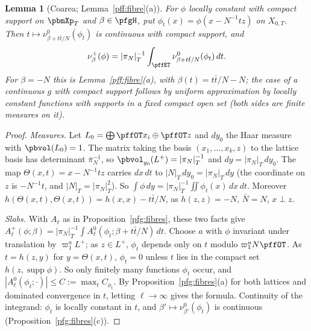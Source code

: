 \documentclass[10pt]{amsart}
\newtheorem{lemma}[theorem]{Lemma}
\theoremstyle{definition}
\theoremstyle{remark}
\begin{document}
\begin{lemma}[Coarea; Lemma~\ref{pff:fibre}(a)]\label{pfg:coarea}
For $\phi$ locally constant with compact support on $\pbmXp_T$ and $\beta\in\pfgH$, put $\phi_t(x)=\phi(x-N^{-1}tz)$ on
$X_{0,T}$. Then $t\mapsto\nu^0_{\beta+t\bar t/N}(\phi_t)$ is continuous with compact support, and
\[
\nu^+_\beta(\phi)=|\pi_N|_T^{-1}\int_{\pffET}\nu^0_{\beta+t\bar t/N}(\phi_t)\,dt .
\]
For $\beta=-N$ this is Lemma~\ref{pff:fibre}(a), with $\beta(t)=t\bar t/N-N$; the case of a continuous $g$ with compact
support follows by uniform approximation by locally constant functions with supports in a fixed compact open set (both
sides are finite measures on it).
\end{lemma}
\begin{proof}
\emph{Measures.} Let $L_0=\bigoplus\pffOT x_i\oplus\pffOT z$ and $dy_0$ the Haar measure with $\pbvol(L_0)=1$. The matrix taking
the basis $(x_1,\dots,x_k,z)$ to the lattice basis has determinant $\bar\pi_N^{-1}$, so $\pbvol_{y_0}(L^+)=|\pi_N|_T^{-1}$ and
$dy=|\pi_N|_T\,dy_0$. The map $\Theta(x,t)=x-N^{-1}tz$ carries $dx\,dt$ to $|N|_T\,dy_0=|\pi_N|_T\,dy$ (the coordinate on $z$
is $-N^{-1}t$, and $|N|_T=|\pi_N|_T^2$). So $\int\phi\,dy=|\pi_N|_T^{-1}\iint\phi_t(x)\,dx\,dt$. Moreover
$h(\Theta(x,t),\Theta(x,t))=h(x,x)-t\bar t/N$, as $h(z,z)=-N$, $\bar N=N$, $x\perp z$.

\emph{Slabs.} With $A_\ell$ as in Proposition~\ref{pfg:fibres}, these two facts give
$A^+_\ell(\phi;\beta)=|\pi_N|_T^{-1}\int A^0_\ell(\phi_t;\beta+t\bar t/N)\,dt$. Choose $a$ with $\phi$ invariant under translation
by $\varpi_1^aL^+$; as $z\in L^+$, $\phi_t$ depends only on $t$ modulo $\varpi_1^aN\pffOT$. As $t=h(z,y)$ for
$y=\Theta(x,t)$, $\phi_t=0$ unless $t$ lies in the compact set $h(z,\operatorname{supp}\phi)$. So only finitely many
functions $\phi_t$ occur, and $|A^0_\ell(\phi_t;\cdot)|\le C:=\max_tC_{\phi_t}$. By Proposition~\ref{pfg:fibres}(a) for both
lattices and dominated convergence in $t$, letting $\ell\to\infty$ gives the formula. Continuity of the integrand: $\phi_t$
is locally constant in $t$, and $\beta'\mapsto\nu^0_{\beta'}(\phi_t)$ is continuous (Proposition~\ref{pfg:fibres}(c)).
\end{proof}
\end{document}
